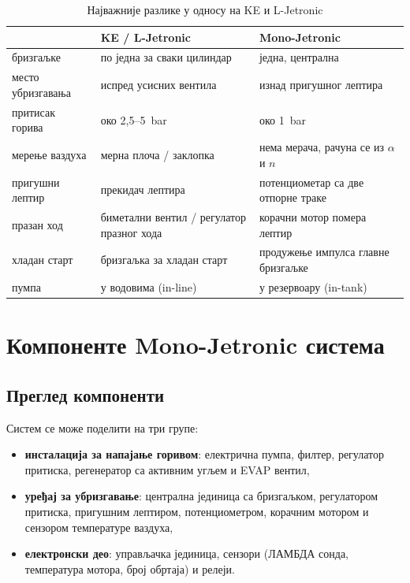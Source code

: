 \documentclass{report}
\begin{document}
\begin{table}[H]
    \centering
    \small
    \renewcommand{\arraystretch}{1.3}
    \begin{tabular}{p{4.2cm} p{4.6cm} p{4.6cm}}
        \toprule
                                & \textbf{KE / L-Jetronic}               & \textbf{Mono-Jetronic} \\
        \midrule
        бризгаљке               & по једна за сваки цилиндар              & једна, централна \\
        место убризгавања       & испред усисних вентила                  & изнад пригушног лептира \\
        притисак горива         & око 2,5--5~bar                          & око 1~bar \\
        мерење ваздуха          & мерна плоча / заклопка                  & нема мерача, рачуна се из $\alpha$ и $n$ \\
        пригушни лептир         & прекидач лептира                        & потенциометар са две отпорне траке \\
        празан ход              & биметални вентил / регулатор празног хода & корачни мотор помера лептир \\
        хладан старт            & бризгаљка за хладан старт               & продужење импулса главне бризгаљке \\
        пумпа                   & у водовима (in-line)                    & у резервоару (in-tank) \\
        \bottomrule
    \end{tabular}
    \caption{Најважније разлике у односу на KE и L-Jetronic}
\end{table}

\chapter{Компоненте Mono-Jetronic система}

\section{Преглед компоненти}

Систем се може поделити на три групе:

\begin{kljucno}
\begin{itemize}[noitemsep]
    \item \textbf{инсталација за напајање горивом}: електрична пумпа, филтер,
          регулатор притиска, регенератор са активним угљем и EVAP вентил,
    \item \textbf{уређај за убризгавање}: централна јединица са бризгаљком,
          регулатором притиска, пригушним лептиром, потенциометром, корачним
          мотором и сензором температуре ваздуха,
    \item \textbf{електронски део}: управљачка јединица, сензори (ЛАМБДА
          сонда, температура мотора, број обртаја) и релеји.
\end{itemize}
\end{kljucno}
\end{document}
